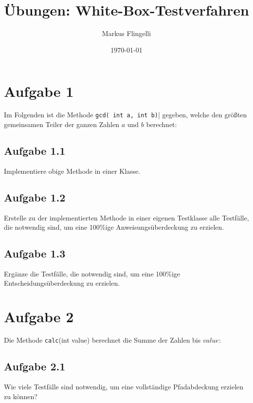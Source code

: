 

\title{Übungen: White-Box-Testverfahren}
\author{Markus Flingelli}
\date{\today}


\maketitle

\section*{Aufgabe 1}
Im Folgenden ist die Methode \lstinline{gcd( int a, int b)}| gegeben, welche den größten gemeinsamen Teiler der ganzen Zahlen $a$ und $b$ berechnet:



\subsection*{Aufgabe 1.1}

Implementiere obige Methode in einer Klasse.

\subsection*{Aufgabe 1.2}

Erstelle zu der implementierten Methode in einer eigenen Testklasse alle Testfälle, die notwendig sind, um eine 100\%ige Anweisungsüberdeckung zu erzielen.

\subsection*{Aufgabe 1.3}

Ergänze die Testfälle, die notwendig sind, um eine 100\%ige Entscheidungsüberdeckung zu erzielen.

\newpage
\section*{Aufgabe 2}
Die Methode \lstinline{calc}(int value) berechnet die Summe der Zahlen bis $value$:



\subsection*{Aufgabe 2.1}
Wie viele Testfälle sind notwendig, um eine vollständige Pfadabdeckung erzielen zu können?

